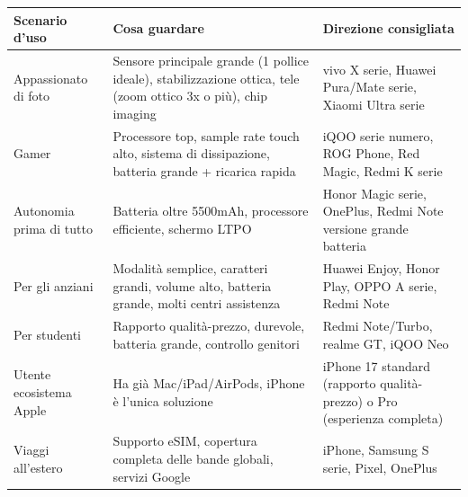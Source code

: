 \begin{center}
\begin{tabularx}{\linewidth}{|X|X|X|}
\hline
\textbf{Scenario d'uso} & \textbf{Cosa guardare} & \textbf{Direzione consigliata} \tabularnewline
\hline
Appassionato di foto & Sensore principale grande (1 pollice ideale), stabilizzazione ottica, tele (zoom ottico 3x o più), chip imaging & vivo X serie, Huawei Pura/Mate serie, Xiaomi Ultra serie \tabularnewline
Gamer & Processore top, sample rate touch alto, sistema di dissipazione, batteria grande + ricarica rapida & iQOO serie numero, ROG Phone, Red Magic, Redmi K serie \tabularnewline
Autonomia prima di tutto & Batteria oltre 5500mAh, processore efficiente, schermo LTPO & Honor Magic serie, OnePlus, Redmi Note versione grande batteria \tabularnewline
Per gli anziani & Modalità semplice, caratteri grandi, volume alto, batteria grande, molti centri assistenza & Huawei Enjoy, Honor Play, OPPO A serie, Redmi Note \tabularnewline
Per studenti & Rapporto qualità-prezzo, durevole, batteria grande, controllo genitori & Redmi Note/Turbo, realme GT, iQOO Neo \tabularnewline
Utente ecosistema Apple & Ha già Mac/iPad/AirPods, iPhone è l'unica soluzione & iPhone 17 standard (rapporto qualità-prezzo) o Pro (esperienza completa) \tabularnewline
Viaggi all'estero & Supporto eSIM, copertura completa delle bande globali, servizi Google & iPhone, Samsung S serie, Pixel, OnePlus \tabularnewline
\hline
\end{tabularx}
\end{center}


